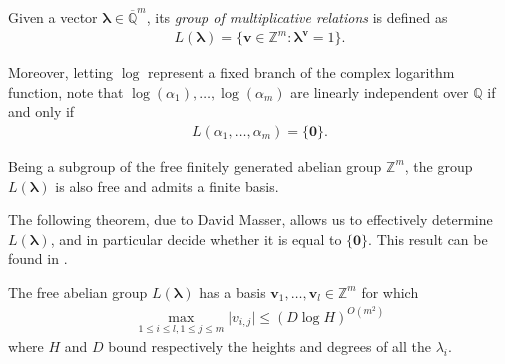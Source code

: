 Given a vector $\boldsymbol{\lambda} \in \overline{\mathbb{Q}}^{m}$, its \emph{group of multiplicative relations} is defined as
\begin{align*}
L(\boldsymbol{\lambda}) = \lbrace \boldsymbol{v} \in \mathbb{Z}^{m} : \boldsymbol{\lambda}^{\boldsymbol{v}} = 1 \rbrace .
\end{align*}

Moreover, letting $\log$ represent a fixed branch of the complex logarithm function, note that $\log(\alpha_{1}), \ldots, \log(\alpha_{m})$ are linearly independent over $\mathbb{Q}$ if and only if
\begin{align*}
L(\alpha_{1}, \ldots, \alpha_{m}) = \lbrace \boldsymbol{0} \rbrace .
\end{align*}

Being a subgroup of the free finitely generated abelian group $\mathbb{Z}^{m}$, the group $L(\boldsymbol{\lambda})$ is also free and admits a finite basis.

The following theorem, due to David Masser, allows us to effectively determine $L(\boldsymbol{\lambda})$, and in particular decide whether it is equal to $\lbrace \boldsymbol{0} \rbrace$. This result can be found in \cite{Masser}.

\begin{theorem}[Masser]
The free abelian group $L(\boldsymbol{\lambda})$ has a basis $\boldsymbol{v}_{1}, \ldots, \boldsymbol{v}_{l} \in \mathbb{Z}^{m}$ for which
\begin{align*}
\max\limits_{1 \leq i \leq l, 1 \leq j \leq m} \lvert v_{i,j} \rvert \leq (D \log H)^{O(m^{2})}
\end{align*}
where $H$ and $D$ bound respectively the heights and degrees of all the $\lambda_{i}$.
\end{theorem}
